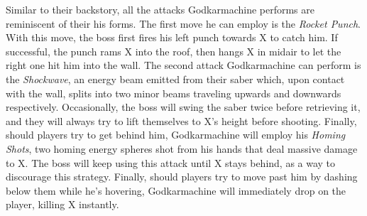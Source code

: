 Similar to their backstory, all the attacks Godkarmachine performs are reminiscent of their his forms. The first move he can employ is the \emph{Rocket Punch}. With this move, the boss first fires his left punch towards X to catch him. If successful, the punch rams X into the roof, then hangs X in midair to let the right one hit him into the wall. The second attack Godkarmachine can perform is the \emph{Shockwave}, an energy beam emitted from their saber which, upon contact with the wall, splits into two minor beams traveling upwards and downwards respectively. Occasionally, the boss will swing the saber twice before retrieving it, and they will always try to lift themselves to X's height before shooting. Finally, should players try to get behind him, Godkarmachine will employ his \emph{Homing Shots}, two homing energy spheres shot from his hands that deal massive damage to X. The boss will keep using this attack until X stays behind, as a way to discourage this strategy. Finally, should players try to move past him by dashing below them while he's hovering, Godkarmachine will immediately drop on the player, killing X instantly.
